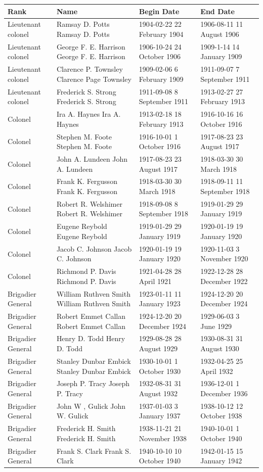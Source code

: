 \documentclass{article}
\begin{document}
\begin{tabular}{llll}
\toprule
Rank & Name & Begin Date & End Date \\
\midrule
Lieutenant colonel & Ramsay D. Potts Ramsay D. Potts & 1904-02-22 22 February 1904 & 1906-08-11 11 August 1906 \\
Lieutenant colonel & George F. E. Harrison George F. E. Harrison & 1906-10-24 24 October 1906 & 1909-1-14 14 January 1909 \\
Lieutenant colonel & Clarence P. Townsley Clarence Page Townsley & 1909-02-06 6 February 1909 & 1911-09-07 7 September 1911 \\
Lieutenant colonel & Frederick S. Strong Frederick S. Strong & 1911-09-08 8 September 1911 & 1913-02-27 27 February 1913 \\
Colonel & Ira A. Haynes Ira A. Haynes & 1913-02-18 18 February 1913 & 1916-10-16 16 October 1916 \\
Colonel & Stephen M. Foote Stephen M. Foote & 1916-10-01 1 October 1916 & 1917-08-23 23 August 1917 \\
Colonel & John A. Lundeen John A. Lundeen & 1917-08-23 23 August 1917 & 1918-03-30 30 March 1918 \\
Colonel & Frank K. Fergusson Frank K. Fergusson & 1918-03-30 30 March 1918 & 1918-09-11 11 September 1918 \\
Colonel & Robert R. Welshimer Robert R. Welshimer & 1918-09-08 8 September 1918 & 1919-01-29 29 January 1919 \\
Colonel & Eugene Reybold Eugene Reybold & 1919-01-29 29 January 1919 & 1920-01-19 19 January 1920 \\
Colonel & Jacob C. Johnson Jacob C. Johnson & 1920-01-19 19 January 1920 & 1920-11-03 3 November 1920 \\
Colonel & Richmond P. Davis Richmond P. Davis & 1921-04-28 28 April 1921 & 1922-12-28 28 December 1922 \\
Brigadier General & William Ruthven Smith William Ruthven Smith & 1923-01-11 11 January 1923 & 1924-12-20 20 December 1924 \\
Brigadier General & Robert Emmet Callan Robert Emmet Callan & 1924-12-20 20 December 1924 & 1929-06-03 3 June 1929 \\
Brigadier General & Henry D. Todd Henry D. Todd & 1929-08-28 28 August 1929 & 1930-08-31 31 August 1930 \\
Brigadier General & Stanley Dunbar Embick Stanley Dunbar Embick & 1930-10-01 1 October 1930 & 1932-04-25 25 April 1932 \\
Brigadier General & Joseph P. Tracy Joseph P. Tracy & 1932-08-31 31 August 1932 & 1936-12-01 1 December 1936 \\
Brigadier General & John W , Gulick John W. Gulick & 1937-01-03 3 January 1937 & 1938-10-12 12 October 1938 \\
Brigadier General & Frederick H. Smith Frederick H. Smith & 1938-11-21 21 November 1938 & 1940-10-01 1 October 1940 \\
Brigadier General & Frank S. Clark Frank S. Clark & 1940-10-10 10 October 1940 & 1942-01-15 15 January 1942 \\
\bottomrule
\end{tabular}
\end{document}
